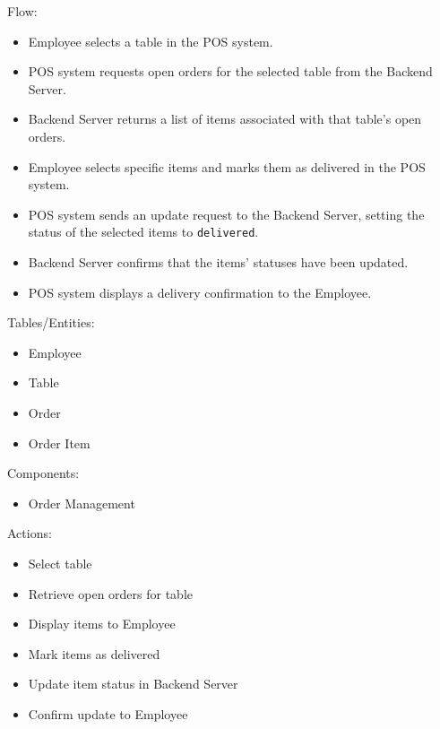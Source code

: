 \documentclass[]{VUMIFTemplateClass}
\begin{document}
Flow:
\begin{itemize}
\setlength{\itemsep}{2pt}
\setlength{\parskip}{0pt}
\setlength{\parsep}{0pt}
\item Employee selects a table in the POS system.
\item POS system requests open orders for the selected table from the Backend Server.
\item Backend Server returns a list of items associated with that table’s open orders.
\item Employee selects specific items and marks them as delivered in the POS system.
\item POS system sends an update request to the Backend Server, setting the status of the selected items to \texttt{delivered}.
\item Backend Server confirms that the items’ statuses have been updated.
\item POS system displays a delivery confirmation to the Employee.
\end{itemize}

Tables/Entities:
\begin{itemize}
\setlength{\itemsep}{2pt}
\setlength{\parskip}{0pt}
\setlength{\parsep}{0pt}
\item Employee
\item Table 
\item Order
\item Order Item
\end{itemize}

Components:
\begin{itemize}
\setlength{\itemsep}{2pt}
\setlength{\parskip}{0pt}
\setlength{\parsep}{0pt}
\item Order Management
\end{itemize}

Actions:
\begin{itemize}
\setlength{\itemsep}{2pt}
\setlength{\parskip}{0pt}
\setlength{\parsep}{0pt}
\item Select table
\item Retrieve open orders for table
\item Display items to Employee
\item Mark items as delivered
\item Update item status in Backend Server
\item Confirm update to Employee
\end{itemize}
\end{document}
